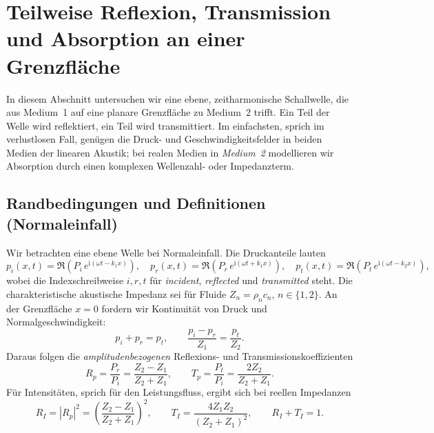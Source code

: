 %
%
%
%
\section{Teilweise Reflexion, Transmission und Absorption an einer Grenzfläche
\label{schall:section:teil2}}

In diesem Abschnitt untersuchen wir eine ebene, zeit\-harmonische Schallwelle,
die aus Medium~1 auf eine planare Grenzfläche zu Medium~2 trifft.
Ein Teil der Welle wird reflektiert, ein Teil wird transmittiert.
Im einfachsten, sprich im verlustlosen Fall, genügen die Druck- und
Geschwindigkeitsfelder in beiden Medien der linearen Akustik;
bei realen Medien in \emph{Medium~2} modellieren wir Absorption durch
einen komplexen Wellenzahl- oder Impedanzterm.

\subsection{Randbedingungen und Definitionen (Normal\-einfall)}
Wir betrachten eine ebene Welle bei Normal\-einfall.
Die Druckanteile lauten
\[
    p_i(x,t)=\Re( P_i\,e^{\mathrm{i}(\omega t-k_1 x)}),\quad
    p_r(x,t)=\Re( P_r\,e^{\mathrm{i}(\omega t+k_1 x)}),\quad
    p_t(x,t)=\Re( P_t\,e^{\mathrm{i}(\omega t-k_2 x)}),
\]
wobei die Indexschreibweise $i,r,t$ für \emph{incident}, \emph{reflected} und \emph{transmitted} steht.
Die charakteristische akustische Impedanz sei für Fluide $Z_n=\rho_n c_n$, $n\in\{1,2\}$.
An der Grenzfläche $x=0$ fordern wir Kontinuität von Druck und Normalgeschwindigkeit:
\[
    p_i+p_r=p_t,\qquad \frac{p_i-p_r}{Z_1}=\frac{p_t}{Z_2}.
\]
Daraus folgen die \emph{amplitudenbezogenen} Reflexions- und Transmissionskoeffizienten
\begin{equation}
    R_p=\frac{P_r}{P_i}=\frac{Z_2-Z_1}{Z_2+Z_1},
    \qquad
    T_p=\frac{P_t}{P_i}=\frac{2Z_2}{Z_2+Z_1}.
    \label{eq:RpTp}
\end{equation}
Für Intensitäten, sprich für den Leistungsfluss, ergibt sich bei reellen Impedanzen \cite{schall:kinsler, schall:allenRT}
\begin{equation}
    R_I=\left|R_p\right|^2=\left(\frac{Z_2-Z_1}{Z_2+Z_1}\right)^2,\qquad
    T_I=\frac{4Z_1Z_2}{(Z_2+Z_1)^2},
    \qquad
    R_I+T_I=1.
    \label{eq:RI_TI}
\end{equation}

